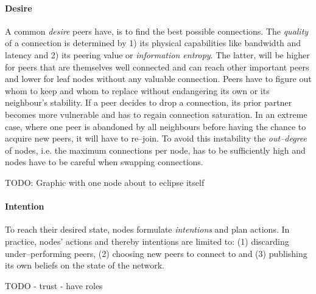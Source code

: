 \paragraph{Desire}\label{par:bdi-desire}
A common \textit{desire} peers have, is to find the best possible connections. The \textit{quality} of a connection is determined by 1) its physical capabilities like bandwidth and latency and 2) its peering value or \textit{information entropy}. The latter, will be higher for peers that are themselves well connected and can reach other important peers and lower for leaf nodes without any valuable connection.
Peers have to figure out whom to keep and whom to replace without endangering its own or its neighbour's stability. If a peer decides to drop a connection, its prior partner becomes more vulnerable and has to regain connection saturation. In an extreme case, where one peer is abandoned by all neighbours before having the chance to acquire new peers, it will have to re–join. To avoid this instability the \textit{out–degree} of nodes, i.e. the maximum connections per node, has to be sufficiently high and nodes have to be careful when swapping connections.

TODO: Graphic with one node about to eclipse itself

\paragraph{Intention}\label{par:bdi-intention}
To reach their desired state, nodes formulate \textit{intentions} and plan actions. In practice, nodes' actions and thereby intentions are limited to: (1) discarding under–performing peers, (2) choosing new peers to connect to and (3) publishing its own beliefs on the state of the network.

TODO
- trust
- have roles
